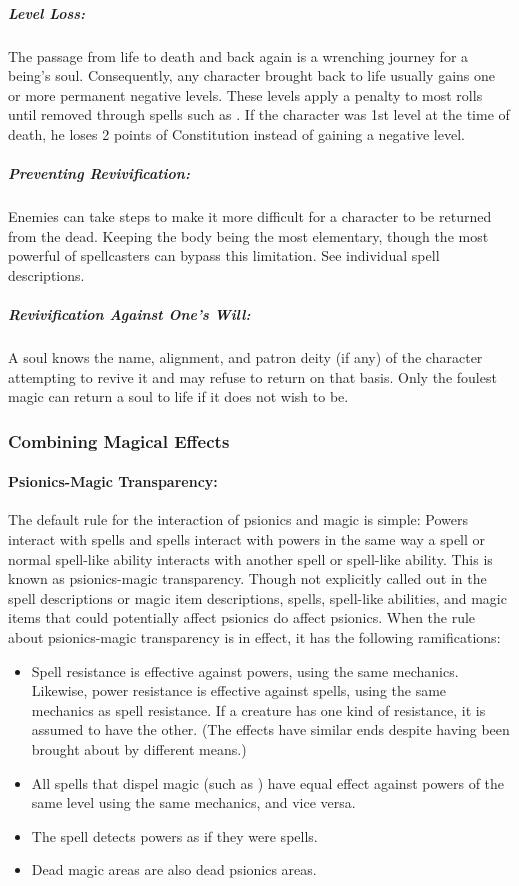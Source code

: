 \documentclass[../VancianToPsionics.tex]{subfiles}
\begin{document}
\subparagraph{Level Loss:} The passage from life to death and back again is a wrenching journey for a being's soul. Consequently, any character brought back to life usually gains one or more permanent negative levels. These levels apply a penalty to most rolls until removed through spells such as . If the character was 1st level at the time of death, he loses 2 points of Constitution instead of gaining a negative level.


\subparagraph{Preventing Revivification:} 
Enemies can take steps to make it more difficult for a character to be returned from the dead. Keeping the body being the most elementary, though the most powerful of spellcasters can bypass this limitation. See individual spell descriptions.

\subparagraph{Revivification Against One's Will:} 
A soul knows the name, alignment, and patron deity (if any) of the character attempting to revive it and may refuse to return on that basis. Only the foulest magic can return a soul to life if it does not wish to be.

\subsubsection{Combining Magical Effects}
\label{sec:CombiningMagicalEffects}
\paragraph{Psionics-Magic Transparency:} The default rule for the interaction of psionics and magic is simple: Powers interact with spells and spells interact with powers in the same way a spell or normal spell-like ability interacts with another spell or spell-like ability. This is known as psionics-magic transparency. Though not explicitly called out in the spell descriptions or magic item descriptions, spells, spell-like abilities, and magic items that could potentially affect psionics do affect psionics. When the rule about psionics-magic transparency is in effect, it has the following ramifications:
\begin{itemize}
\item Spell resistance is effective against powers, using the same mechanics. Likewise, power resistance is effective against spells, using the same mechanics as spell resistance. If a creature has one kind of resistance, it is assumed to have the other. (The effects have similar ends despite having been brought about by different means.)
\item All spells that dispel magic (such as ) have equal effect against powers of the same level using the same mechanics, and vice versa.
\item The spell  detects powers as if they were spells.
\item Dead magic areas are also dead psionics areas.
\end{itemize}
\end{document}
